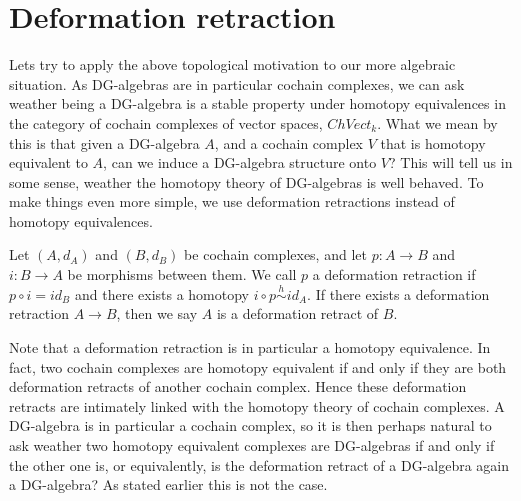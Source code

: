 

\section{Deformation retraction}



Lets try to apply the above topological motivation to our more algebraic situation. As DG-algebras are in particular cochain complexes, we can ask weather being a DG-algebra is a stable property under homotopy equivalences in the category of cochain complexes of vector spaces, $ChVect_k$. What we mean by this is that given a DG-algebra $A$, and a cochain complex $V$ that is homotopy equivalent to $A$, can we induce a DG-algebra structure onto $V$? This will tell us in some sense, weather the homotopy theory of DG-algebras is well behaved. To make things even more simple, we use deformation retractions instead of homotopy equivalences. 

\begin{definition}
Let $(A, d_A)$ and $(B, d_B)$ be cochain complexes, and let $p:A\longrightarrow B$ and $i:B\longrightarrow A$ be morphisms between them. We call $p$ a deformation retraction if $p\circ i = id_B$ and there exists a homotopy $i\circ p\overset{h}\sim id_A$. If there exists a deformation retraction $A\longrightarrow B$, then we say $A$ is a deformation retract of $B$. 
\end{definition}

Note that a deformation retraction is in particular a homotopy equivalence. In fact, two cochain complexes are homotopy equivalent if and only if they are both deformation retracts of another cochain complex. Hence these deformation retracts are intimately linked with the homotopy theory of cochain complexes. A DG-algebra is in particular a cochain complex, so it is then perhaps natural to ask weather two homotopy equivalent complexes are DG-algebras if and only if the other one is, or equivalently, is the deformation retract of a DG-algebra again a DG-algebra? As stated earlier this is not the case. 

